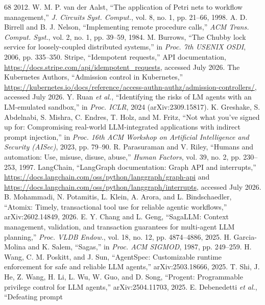\documentclass[10pt,journal,compsoc]{IEEEtran}
\begin{document}
\begin{thebibliography}{68}
2012.
 W. M. P. van der Aalst, ``The application of Petri nets
to workflow management,'' \emph{J. Circuits Syst. Comput.}, vol. 8, no. 1,
pp. 21--66, 1998.
 A. D. Birrell and B. J. Nelson, ``Implementing remote
procedure calls,'' \emph{ACM Trans. Comput. Syst.}, vol. 2, no. 1,
pp. 39--59, 1984.
 M. Burrows, ``The Chubby lock service for
loosely-coupled distributed systems,'' in \emph{Proc. 7th USENIX OSDI},
2006, pp. 335--350.
 Stripe, ``Idempotent requests,'' API documentation,
\url{https://docs.stripe.com/api/idempotent_requests}, accessed July 2026.
 The Kubernetes Authors, ``Admission control in
Kubernetes,'' \url{https://kubernetes.io/docs/reference/access-authn-authz/admission-controllers/},
accessed July 2026.
 Y. Ruan \emph{et al.}, ``Identifying the risks of LM
agents with an LM-emulated sandbox,'' in \emph{Proc. ICLR}, 2024
(arXiv:2309.15817).
 K. Greshake, S. Abdelnabi, S. Mishra, C. Endres,
T. Holz, and M. Fritz, ``Not what you've signed up for: Compromising
real-world LLM-integrated applications with indirect prompt injection,'' in
\emph{Proc. 16th ACM Workshop on Artificial Intelligence and Security
(AISec)}, 2023, pp. 79--90.
 R. Parasuraman and V. Riley, ``Humans and
automation: Use, misuse, disuse, abuse,'' \emph{Human Factors}, vol. 39,
no. 2, pp. 230--253, 1997.
 LangChain, ``LangGraph documentation: Graph API and
interrupts,'' \url{https://docs.langchain.com/oss/python/langgraph/graph-api}
and \url{https://docs.langchain.com/oss/python/langgraph/interrupts},
accessed July 2026.
 B. Mohammadi, N. Potamitis, L. Klein, A. Arora, and
L. Bindschaedler, ``Atomix: Timely, transactional tool use for reliable
agentic workflows,'' arXiv:2602.14849, 2026.
 E. Y. Chang and L. Geng, ``SagaLLM: Context management,
validation, and transaction guarantees for multi-agent LLM planning,''
\emph{Proc. VLDB Endow.}, vol. 18, no. 12, pp. 4874--4886, 2025.
 H. Garcia-Molina and K. Salem, ``Sagas,'' in \emph{Proc.
ACM SIGMOD}, 1987, pp. 249--259.
 H. Wang, C. M. Poskitt, and J. Sun, ``AgentSpec:
Customizable runtime enforcement for safe and reliable LLM agents,''
arXiv:2503.18666, 2025.
 T. Shi, J. He, Z. Wang, H. Li, L. Wu, W. Guo, and
D. Song, ``Progent: Programmable privilege control for LLM agents,''
arXiv:2504.11703, 2025.
 E. Debenedetti \emph{et al.}, ``Defeating prompt

\end{thebibliography}
\end{document}
